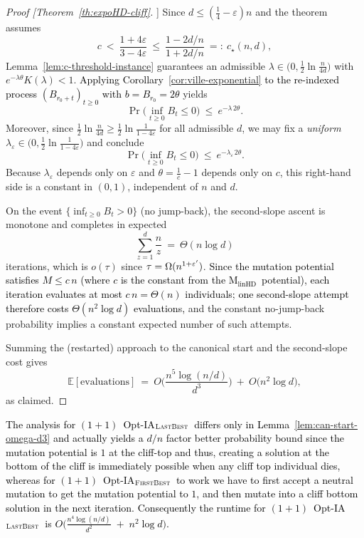 \documentclass[lettersize,journal]{IEEEtran}
\newcommand{\rerev}[1]{\textcolor{black}{#1}}
\newcommand{\EE}{\mathbb{E}}
\newcommand{\linHD}{M$_{\text{linHD}}$}
\newcommand{\firstBest}{$(1+1)$~Opt-IA$_{\textsc{FirstBest}}$}
\newcommand{\lastBest}{$(1+1)$~Opt-IA$_{\textsc{LastBest}}$}
\begin{document}
{\begin{proof}[Proof [Theorem~\ref{th:expoHD-cliff}]]
	Since $d\le(\tfrac14-\varepsilon)n$ and the theorem assumes
	\[
	c\ <\ \frac{1+4\varepsilon}{3-4\varepsilon}\ \le\ \frac{1-2d/n}{1+2d/n}\ =:\ c_\star(n,d),
	\]
	Lemma~\ref{lem:c-threshold-instance} guarantees an admissible $\lambda\in\big(0,\tfrac12\ln\tfrac{n}{4d}\big)$ with $e^{-\lambda\theta}K(\lambda)<1$.
	\rerev{Applying Corollary~\ref{cor:ville-exponential} to the re-indexed process $(B_{r_0+t})_{t\ge0}$ with $b=B_{r_0}=2\theta$} yields
	\[
	\Pr\!\Big(\inf_{t\ge 0} B_t\le 0\Big)\ \le\ e^{-\lambda\,2\theta}.
	\]
	Moreover, since $\tfrac12\ln\!\tfrac{n}{4d}\ge \tfrac12\ln\!\tfrac{1}{1-4\varepsilon}$ for all admissible $d$, we may fix a \emph{uniform} $\lambda_\varepsilon\in\big(0,\tfrac12\ln\tfrac{1}{1-4\varepsilon}\big)$ and conclude
	\[
	\Pr\!\Big(\inf_{t\ge 0} B_t\le 0\Big)\ \le\ e^{-\lambda_\varepsilon\,2\theta}.
	\]
	Because $\lambda_\varepsilon$ depends only on $\varepsilon$ and $\theta=\tfrac1c-1$ depends only on $c$, this right-hand side is a constant in $(0,1)$, independent of $n$ and $d$.
	
	\smallskip
	On the event $\{\inf_{t\ge 0} B_t>0\}$ (no jump-back), the second-slope ascent is monotone and completes in expected
	\[
	\sum_{z=1}^{d}\frac{n}{z}\ =\ \Theta(n\log d)
	\]
	iterations, which is $o(\tau)$ since $\tau=\Omega(n^{1+\rerev{\varepsilon'}})$. \textcolor{black}{Since the mutation potential satisfies $M \le c\,n$ (where $c$ is the constant
		from the \linHD\ potential), each iteration evaluates at most $c\,n =\Theta(n)$
		individuals; one second-slope attempt therefore costs $\Theta(n^{2}\log d)$
		evaluations,} and the constant no-jump-back probability implies a constant expected number of such attempts.
	
	\smallskip
	
	Summing the (restarted) approach to the canonical start and the second-slope cost gives
	\[
	\EE[\text{evaluations}]
	\ =\ O\!\Big(\frac{n^{5}\log(n/d)}{d^{3}}\Big)\ +\ O\!\big(n^{2}\log d\big),
	\]
	as claimed.
\end{proof}



\textcolor{black}{The analysis for \lastBest~differs only in Lemma~\ref{lem:can-start-omega-d3} and actually yields a $d/n$ factor better probability bound since the mutation potential is $1$ at the cliff-top and thus, creating a solution at the bottom of the cliff is immediately possible when any cliff top individual dies, whereas for \firstBest~to work we have to first accept a neutral mutation to get the mutation potential to $1$, and then mutate into a cliff bottom solution in the next iteration. Consequently the runtime for \lastBest~is  
$O\!\Big(\frac{n^{4}\log(n/d)}{d^{2}} \;+\; n^{2}\log d\Big)$.}

}
\end{document}
